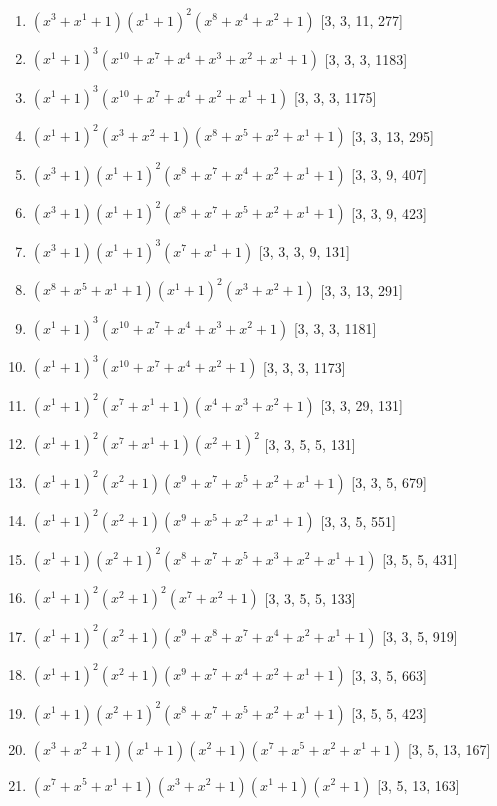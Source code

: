 \documentclass[10pt,twocolumn]{article}
\begin{document}
\begin{enumerate}
\item $(x^{3} + x^{1} + 1)(x^{1} + 1)^{2}(x^{8} + x^{4} + x^{2} + 1)$  [3, 3, 11, 277]
\item $(x^{1} + 1)^{3}(x^{10} + x^{7} + x^{4} + x^{3} + x^{2} + x^{1} + 1)$  [3, 3, 3, 1183]
\item $(x^{1} + 1)^{3}(x^{10} + x^{7} + x^{4} + x^{2} + x^{1} + 1)$  [3, 3, 3, 1175]
\item $(x^{1} + 1)^{2}(x^{3} + x^{2} + 1)(x^{8} + x^{5} + x^{2} + x^{1} + 1)$  [3, 3, 13, 295]
\item $(x^{3} + 1)(x^{1} + 1)^{2}(x^{8} + x^{7} + x^{4} + x^{2} + x^{1} + 1)$  [3, 3, 9, 407]
\item $(x^{3} + 1)(x^{1} + 1)^{2}(x^{8} + x^{7} + x^{5} + x^{2} + x^{1} + 1)$  [3, 3, 9, 423]
\item $(x^{3} + 1)(x^{1} + 1)^{3}(x^{7} + x^{1} + 1)$  [3, 3, 3, 9, 131]
\item $(x^{8} + x^{5} + x^{1} + 1)(x^{1} + 1)^{2}(x^{3} + x^{2} + 1)$  [3, 3, 13, 291]
\item $(x^{1} + 1)^{3}(x^{10} + x^{7} + x^{4} + x^{3} + x^{2} + 1)$  [3, 3, 3, 1181]
\item $(x^{1} + 1)^{3}(x^{10} + x^{7} + x^{4} + x^{2} + 1)$  [3, 3, 3, 1173]
\item $(x^{1} + 1)^{2}(x^{7} + x^{1} + 1)(x^{4} + x^{3} + x^{2} + 1)$  [3, 3, 29, 131]
\item $(x^{1} + 1)^{2}(x^{7} + x^{1} + 1)(x^{2} + 1)^{2}$  [3, 3, 5, 5, 131]
\item $(x^{1} + 1)^{2}(x^{2} + 1)(x^{9} + x^{7} + x^{5} + x^{2} + x^{1} + 1)$  [3, 3, 5, 679]
\item $(x^{1} + 1)^{2}(x^{2} + 1)(x^{9} + x^{5} + x^{2} + x^{1} + 1)$  [3, 3, 5, 551]
\item $(x^{1} + 1)(x^{2} + 1)^{2}(x^{8} + x^{7} + x^{5} + x^{3} + x^{2} + x^{1} + 1)$  [3, 5, 5, 431]
\item $(x^{1} + 1)^{2}(x^{2} + 1)^{2}(x^{7} + x^{2} + 1)$  [3, 3, 5, 5, 133]
\item $(x^{1} + 1)^{2}(x^{2} + 1)(x^{9} + x^{8} + x^{7} + x^{4} + x^{2} + x^{1} + 1)$  [3, 3, 5, 919]
\item $(x^{1} + 1)^{2}(x^{2} + 1)(x^{9} + x^{7} + x^{4} + x^{2} + x^{1} + 1)$  [3, 3, 5, 663]
\item $(x^{1} + 1)(x^{2} + 1)^{2}(x^{8} + x^{7} + x^{5} + x^{2} + x^{1} + 1)$  [3, 5, 5, 423]
\item $(x^{3} + x^{2} + 1)(x^{1} + 1)(x^{2} + 1)(x^{7} + x^{5} + x^{2} + x^{1} + 1)$  [3, 5, 13, 167]
\item $(x^{7} + x^{5} + x^{1} + 1)(x^{3} + x^{2} + 1)(x^{1} + 1)(x^{2} + 1)$  [3, 5, 13, 163]

\end{enumerate}
\end{document}
